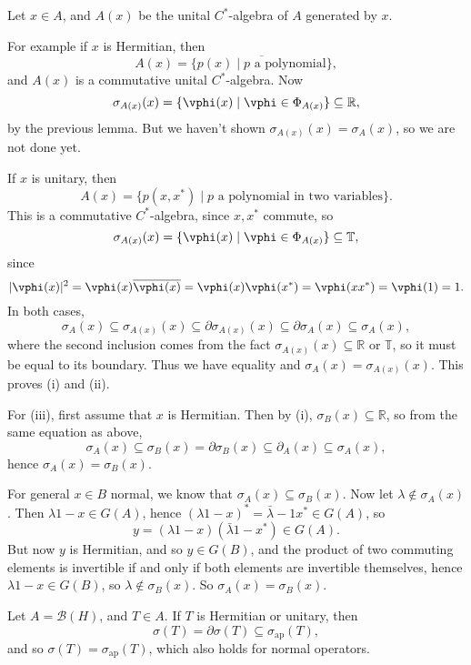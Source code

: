 \documentclass[12pt]{article}
\begin{document}
\begin{proofbox}
	Let $x \in A$, and $A(x)$ be the unital $C^{\ast}$-algebra of $A$ generated by $x$.

	For example if $x$ is Hermitian, then
	\[
		A(x) = \overline{\{p(x) \mid p \text{ a polynomial}\}},
	\]
	and $A(x)$ is a commutative unital $C^{\ast}$-algebra. Now
	\[
		\sigma_{A(x)}(x) = \{\vphi(x) \mid \vphi \in \Phi_{A(x)}\} \subseteq \mathbb{R},
	\]
	by the previous lemma. But we haven't shown $\sigma_{A(x)}(x) = \sigma_A(x)$, so we are not done yet.

	If $x$ is unitary, then
	\[
		A(x) = \{p(x, x^{\ast}) \mid p\text{ a polynomial in two variables}\}.
	\]
	This is a commutative $C^{\ast}$-algebra, since $x, x^{\ast}$ commute, so
	\[
		\sigma_{A(x)}(x) = \{ \vphi(x) \mid \vphi \in \Phi_{A(x)}\} \subseteq \mathbb{T},
	\]
	since
	\[
	|\vphi(x)|^2 = \vphi(x) \overline{\vphi(x)} = \vphi(x) \vphi(x^{\ast}) = \vphi(x x^{\ast}) = \vphi(1) = 1.
	\]
	In both cases,
	\[
	\sigma_A(x) \subseteq \sigma_{A(x)}(x) \subseteq \partial \sigma_{A(x)}(x) \subseteq \partial \sigma_A(x) \subseteq \sigma_A(x),
	\]
	where the second inclusion comes from the fact $\sigma_{A(x)}(x) \subseteq \mathbb{R}$ or $\mathbb{T}$, so it must be equal to its boundary. Thus we have equality and $\sigma_A(x) = \sigma_{A(x)}(x)$. This proves (i) and (ii).

	For (iii), first assume that $x$ is Hermitian. Then by (i), $\sigma_B(x) \subseteq \mathbb{R}$, so from the same equation as above,
	\[
	\sigma_A(x) \subseteq \sigma_B(x) = \partial \sigma_B(x) \subseteq \partial_A(x) \subseteq \sigma_A(x),
	\]
	hence $\sigma_A(x) = \sigma_B(x)$.

	For general $x \in B$ normal, we know that $\sigma_A(x) \subseteq \sigma_B(x)$. Now let $\lambda \not \in \sigma_A(x)$. Then $\lambda1 - x \in G(A)$, hence $(\lambda 1 - x)^{\ast} = \bar \lambda - 1 x^{\ast} \in G(A)$, so
	\[
		y = (\lambda 1 - x)( \bar \lambda 1 - x^{\ast}) \in G(A).
	\]
	But now $y$ is Hermitian, and so $y \in G(B)$, and the product of two commuting elements is invertible if and only if both elements are invertible themselves, hence $\lambda 1 - x \in G(B)$, so $\lambda \not \in \sigma_B(x)$. So $\sigma_A(x) = \sigma_B(x)$.
\end{proofbox}

\begin{remark}
	Let $A = \mathcal{B}(H)$, and $T \in A$. If $T$ is Hermitian or unitary, then
	\[
	\sigma(T) = \partial \sigma(T) \subseteq \sigma_{\mathrm{ap}}(T),
	\]
	and so $\sigma(T) = \sigma_{\mathrm{ap}}(T)$, which also holds for normal operators.
\end{remark}
\end{document}
